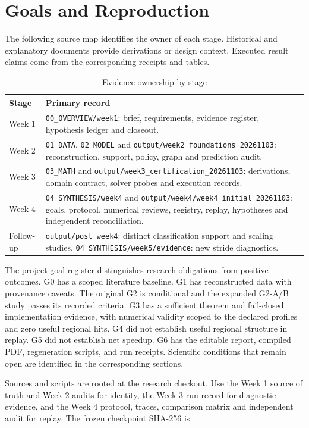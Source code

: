 \documentclass[journal]{IEEEtran}
\newcommand{\code}[1]{\nolinkurl{#1}}
\begin{document}
\section{Goals and Reproduction}
The following source map identifies the owner of each stage. Historical and explanatory documents provide derivations or design context. Executed result claims come from the corresponding receipts and tables.
\begin{table}[H]
\caption{Evidence ownership by stage}
\centering\small
\begin{tabularx}{\columnwidth}{@{}lY@{}}\toprule
Stage & Primary record\\\midrule
Week 1 & \code{00_OVERVIEW/week1}: brief, requirements, evidence register, hypothesis ledger and closeout.\\
Week 2 & \code{01_DATA}, \code{02_MODEL} and \code{output/week2_foundations_20261103}: reconstruction, support, policy, graph and prediction audit.\\
Week 3 & \code{03_MATH} and \code{output/week3_certification_20261103}: derivations, domain contract, solver probes and execution records.\\
Week 4 & \code{04_SYNTHESIS/week4} and \code{output/week4/week4_initial_20261103}: goals, protocol, numerical reviews, registry, replay, hypotheses and independent reconciliation.\\
Follow-up & \code{output/post_week4}: distinct classification support and scaling studies. \code{04_SYNTHESIS/week5/evidence}: new stride diagnostics.\\
\bottomrule\end{tabularx}
\end{table}
The project goal register distinguishes research obligations from positive outcomes. G0 has a scoped literature baseline. G1 has reconstructed data with provenance caveats. The original G2 is conditional and the expanded G2-A/B study passes its recorded criteria. G3 has a sufficient theorem and fail-closed implementation evidence, with numerical validity scoped to the declared profiles and zero useful regional hits. G4 did not establish useful regional structure in replay. G5 did not establish net speedup. G6 has the editable report, compiled PDF, regeneration scripts, and run receipts. Scientific conditions that remain open are identified in the corresponding sections.
\par
Sources and scripts are rooted at the research checkout. Use the Week 1 source of truth and Week 2 audits for identity, the Week 3 run record for diagnostic evidence, and the Week 4 protocol, traces, comparison matrix and independent audit for replay. The frozen checkpoint SHA-256 is
\end{document}
